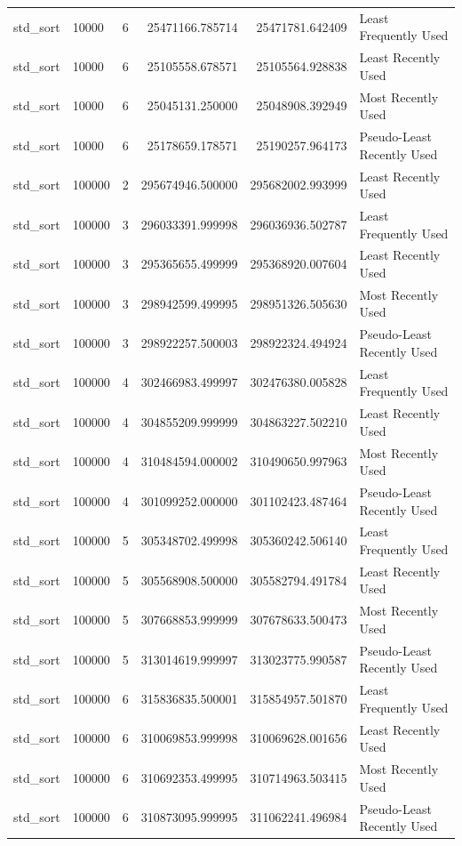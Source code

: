 \begin{tabular}{llrrrl}
std_sort & 10000 & 6 & 25471166.785714 & 25471781.642409 & Least Frequently Used \\
std_sort & 10000 & 6 & 25105558.678571 & 25105564.928838 & Least Recently Used \\
std_sort & 10000 & 6 & 25045131.250000 & 25048908.392949 & Most Recently Used \\
std_sort & 10000 & 6 & 25178659.178571 & 25190257.964173 & Pseudo-Least Recently Used \\
std_sort & 100000 & 2 & 295674946.500000 & 295682002.993999 & Least Recently Used \\
std_sort & 100000 & 3 & 296033391.999998 & 296036936.502787 & Least Frequently Used \\
std_sort & 100000 & 3 & 295365655.499999 & 295368920.007604 & Least Recently Used \\
std_sort & 100000 & 3 & 298942599.499995 & 298951326.505630 & Most Recently Used \\
std_sort & 100000 & 3 & 298922257.500003 & 298922324.494924 & Pseudo-Least Recently Used \\
std_sort & 100000 & 4 & 302466983.499997 & 302476380.005828 & Least Frequently Used \\
std_sort & 100000 & 4 & 304855209.999999 & 304863227.502210 & Least Recently Used \\
std_sort & 100000 & 4 & 310484594.000002 & 310490650.997963 & Most Recently Used \\
std_sort & 100000 & 4 & 301099252.000000 & 301102423.487464 & Pseudo-Least Recently Used \\
std_sort & 100000 & 5 & 305348702.499998 & 305360242.506140 & Least Frequently Used \\
std_sort & 100000 & 5 & 305568908.500000 & 305582794.491784 & Least Recently Used \\
std_sort & 100000 & 5 & 307668853.999999 & 307678633.500473 & Most Recently Used \\
std_sort & 100000 & 5 & 313014619.999997 & 313023775.990587 & Pseudo-Least Recently Used \\
std_sort & 100000 & 6 & 315836835.500001 & 315854957.501870 & Least Frequently Used \\
std_sort & 100000 & 6 & 310069853.999998 & 310069628.001656 & Least Recently Used \\
std_sort & 100000 & 6 & 310692353.499995 & 310714963.503415 & Most Recently Used \\
std_sort & 100000 & 6 & 310873095.999995 & 311062241.496984 & Pseudo-Least Recently Used \\

\end{tabular}
